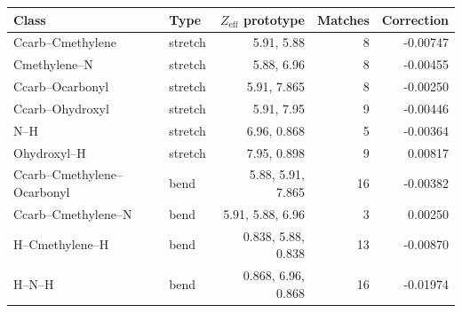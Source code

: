 \begin{tabular}{llrrr}
\toprule
Class & Type & $Z_\mathrm{eff}$ prototype & Matches & Correction \\
\midrule
Ccarb--Cmethylene & stretch & 5.91, 5.88 & 8 & -0.00747 \\
Cmethylene--N & stretch & 5.88, 6.96 & 8 & -0.00455 \\
Ccarb--Ocarbonyl & stretch & 5.91, 7.865 & 8 & -0.00250 \\
Ccarb--Ohydroxyl & stretch & 5.91, 7.95 & 9 & -0.00446 \\
N--H & stretch & 6.96, 0.868 & 5 & -0.00364 \\
Ohydroxyl--H & stretch & 7.95, 0.898 & 9 & 0.00817 \\
Ccarb--Cmethylene--Ocarbonyl & bend & 5.88, 5.91, 7.865 & 16 & -0.00382 \\
Ccarb--Cmethylene--N & bend & 5.91, 5.88, 6.96 & 3 & 0.00250 \\
H--Cmethylene--H & bend & 0.838, 5.88, 0.838 & 13 & -0.00870 \\
H--N--H & bend & 0.868, 6.96, 0.868 & 16 & -0.01974 \\
\bottomrule
\end{tabular}

